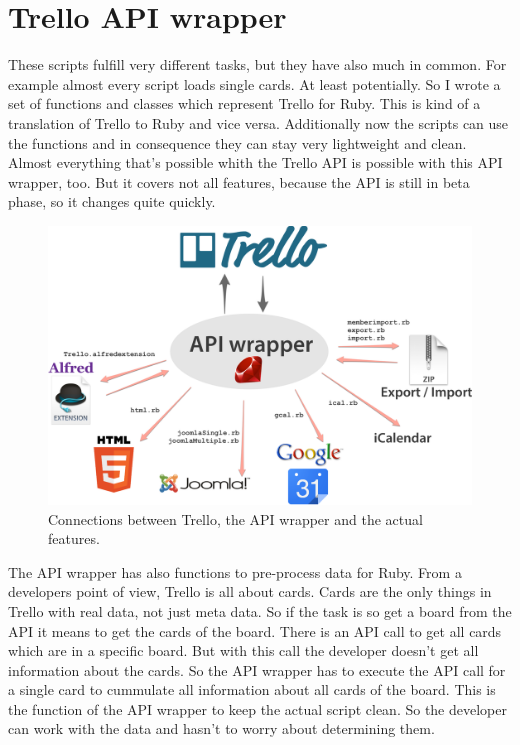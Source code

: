 
\chapter{Trello API wrapper}

These scripts fulfill very different tasks, but they have also much in common. For example almost every script loads single cards. At least potentially. So I wrote a set of functions and classes which represent Trello for Ruby. This is kind of a translation of Trello to Ruby and vice versa. Additionally now the scripts can use the functions and in consequence they can stay very lightweight and clean. Almost everything that's possible whith the Trello API is possible with this API wrapper, too. But it covers not all features, because the API is still in beta phase, so it changes quite quickly.

\begin{figure}[htb]
\centering
\includegraphics[width=\textwidth]{figures/api-wrapper}
\caption{Connections between Trello, the API wrapper and the actual features. \cite{ruby:icon}\cite{html:logo}\cite{joomla}\cite{google} }
\label{fig: api-wrapper}
\end{figure}

The API wrapper has also functions to pre-process data for Ruby. From a developers point of view, Trello is all about cards. Cards are the only things in Trello with real data, not just meta data. So if the task is so get a board from the API it means to get the cards of the board. There is an API call to get all cards which are in a specific board. But with this call the developer doesn't get all information about the cards. So the API wrapper has to execute the API call for a single card to cummulate all information about all cards of the board. This is the function of the API wrapper to keep the actual script clean. So the developer can work with the data and hasn't to worry about determining them.

